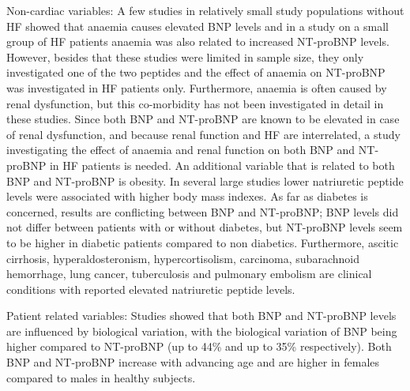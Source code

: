 \documentclass[14pt,a4paper,onecolumn]{extarticle}
\begin{document}
Non-cardiac variables:
A few studies in relatively small study populations without HF showed that anaemia causes elevated BNP levels \citep{Tsuji2004,Willis2005,Wold2005} and in a study on a small group of HF patients anaemia was also related to increased NT-proBNP levels. \citep{Wu2005}
However, besides that these studies were limited in sample size, they only investigated one of the two peptides and the effect of anaemia on NT-proBNP was investigated in HF patients only.
Furthermore, anaemia is often caused by renal dysfunction, but this co-morbidity has not been investigated in detail in these studies. Since both BNP and NT-proBNP are known to be elevated in case of renal dysfunction, \citep{Luchner2005} and because renal function and HF are interrelated, a study investigating the effect of anaemia and renal function on both BNP and NT-proBNP in HF patients is needed.
An additional variable that is related to both BNP and NT-proBNP is obesity. In several large studies lower natriuretic peptide levels were associated with higher body mass indexes. \citep{Das2005,Krauser2005,Mehra2004,Wang2004b} As far as diabetes is concerned, results are conflicting between BNP and NT-proBNP; BNP levels did not differ between patients with or without diabetes, \citep{Wu2004} but NT-proBNP levels seem to be higher in diabetic patients compared to non diabetics. \citep{Magnusson2004}
Furthermore, ascitic cirrhosis, hyperaldosteronism, hypercortisolism, carcinoma, subarachnoid hemorrhage, \citep{Pfister2004} lung cancer, tuberculosis and pulmonary embolism \citep{7} are clinical conditions with reported elevated natriuretic peptide levels.

Patient related variables:
Studies showed that both BNP and NT-proBNP levels are influenced by biological variation, with the biological variation of BNP being higher compared to NT-proBNP (up to 44\% and up to 35\% respectively). \citep{Bruins2004,Wu2003b}
Both BNP and NT-proBNP increase with advancing age and are higher in females compared to males in healthy subjects. \citep{Raymond2003} %
\end{document}
